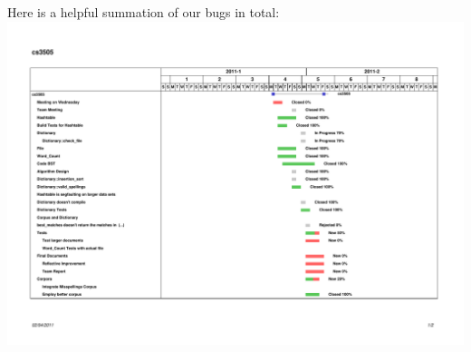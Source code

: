\documentclass[a4paper]{article}
\begin{document}
\begin{itemize}
	Here is a helpful summation of our bugs in total:\\
	\includegraphics[scale=0.6]{cs3505-gantt.pdf}
	
	
\end{itemize}
\end{document}
